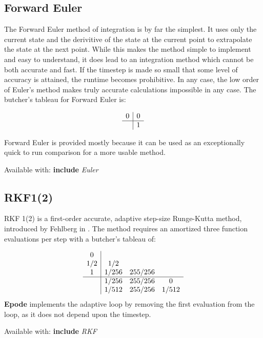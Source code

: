 \documentclass[letterpaper,10pt]{book}
\newcommand{\srcas}[1]{Available with: \textbf{include} \textlangle{}\textit{#1}\textrangle{}}
\newcommand{\epode}[0]{\textbf{Epode}}
\begin{document}
      \subsection{Forward Euler}   
	The Forward Euler method of integration is by far the simplest.  It uses only the current state and the derivitive of the state at the current point to extrapolate the state at the next point.  While this makes the method simple to implement and easy to understand, it does lead to an integration method which cannot be both accurate and fast.  If the timestep is made so small that some level of accuracy is attained, the runtime becomes prohibitive.  In any case, the low order of Euler's method makes truly accurate calculations impossible in any case.  The butcher's tableau for Forward Euler is:
	
	\[
	  \begin{array}{c|c}
	    0 & 0\\
	    \hline
	    & 1
	  \end{array}
	\]
	
	Forward Euler is provided mostly because it can be used as an exceptionally quick to run comparison for a more usable method.
	
	\srcas{Euler}
	
      \subsection{RKF1(2)}
	RKF 1(2) is a first-order accurate, adaptive step-size Runge-Kutta method, introduced by Fehlberg in \cite{fehlberg1969low}.  The method requires an amortized three function evaluations per step with a butcher's tableau of:
	
	\[
	  \begin{array}{c|ccc}
	    0 & & &\\
	    1/2 & 1/2 & &\\
	    1 & 1/256 & 255/256 &\\	    
	    \hline
	    & 1/256 & 255/256 & 0\\
	    & 1/512 & 255/256 & 1/512\\
	  \end{array}
	\]    
	\epode{} implements the adaptive loop by removing the first evaluation from the loop, as it does not depend upon the timestep.
	
	\srcas{RKF}
    	
\end{document}
